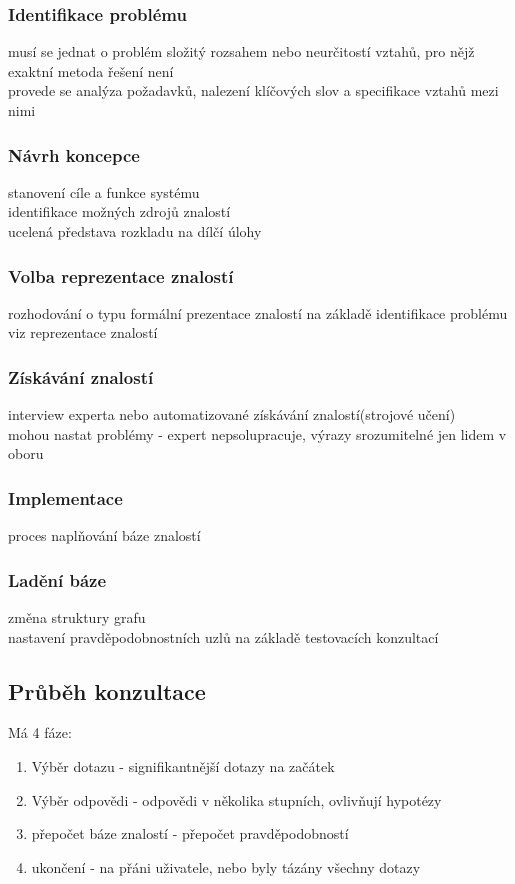 \subsubsection*{Identifikace problému}
musí se jednat o problém složitý rozsahem nebo neurčitostí vztahů, pro nějž exaktní metoda řešení není\\
provede se analýza požadavků, nalezení klíčových slov a specifikace vztahů mezi nimi

\subsubsection*{Návrh koncepce}
stanovení cíle a funkce systému\\
identifikace možných zdrojů znalostí\\
ucelená představa rozkladu na dílčí úlohy\\

\subsubsection*{Volba reprezentace znalostí}
rozhodování o typu formální prezentace znalostí na základě identifikace problému\\
viz reprezentace znalostí\\

\subsubsection*{Získávání znalostí}
interview experta nebo automatizované získávání znalostí(strojové učení)\\
mohou nastat problémy - expert nepsolupracuje, výrazy srozumitelné jen lidem v oboru\\

\subsubsection*{Implementace}
proces naplňování báze znalostí\\

\subsubsection*{Ladění báze}
změna struktury grafu\\
nastavení pravděpodobnostních uzlů na základě testovacích konzultací\\

\subsection*{Průběh konzultace}
Má 4 fáze:
\begin{enumerate}
    \item Výběr dotazu - signifikantnější dotazy na začátek
    \item Výběr odpovědi - odpovědi v několika stupních, ovlivňují hypotézy
    \item přepočet báze znalostí - přepočet pravděpodobností
    \item ukončení - na přáni uživatele, nebo byly tázány všechny dotazy 
\end{enumerate}

